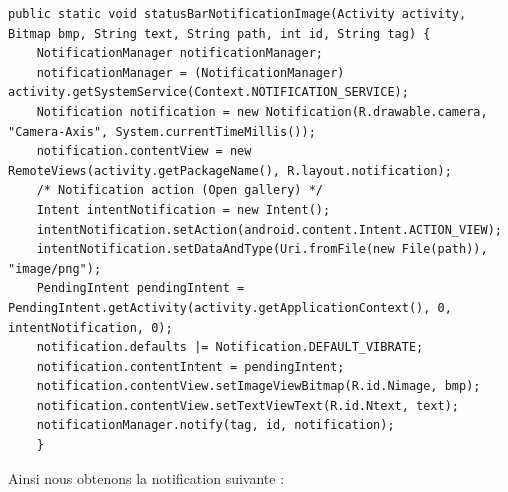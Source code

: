 \begin{changemargin}{0cm}{0cm}
\begin{lstlisting}[caption={ImageView address resolver}] 
 public static void statusBarNotificationImage(Activity activity, Bitmap bmp, String text, String path, int id, String tag) {
	NotificationManager notificationManager;
	notificationManager = (NotificationManager) activity.getSystemService(Context.NOTIFICATION_SERVICE);
	Notification notification = new Notification(R.drawable.camera,	"Camera-Axis", System.currentTimeMillis());
	notification.contentView = new RemoteViews(activity.getPackageName(), R.layout.notification);
	/* Notification action (Open gallery) */ 
	Intent intentNotification = new Intent();
	intentNotification.setAction(android.content.Intent.ACTION_VIEW);
	intentNotification.setDataAndType(Uri.fromFile(new File(path)), "image/png");
	PendingIntent pendingIntent = PendingIntent.getActivity(activity.getApplicationContext(), 0, intentNotification, 0);
	notification.defaults |= Notification.DEFAULT_VIBRATE;
	notification.contentIntent = pendingIntent;
	notification.contentView.setImageViewBitmap(R.id.Nimage, bmp);
	notification.contentView.setTextViewText(R.id.Ntext, text);
	notificationManager.notify(tag, id, notification);
    }
\end{lstlisting}   
\end{changemargin}
Ainsi nous obtenons la notification suivante : 
